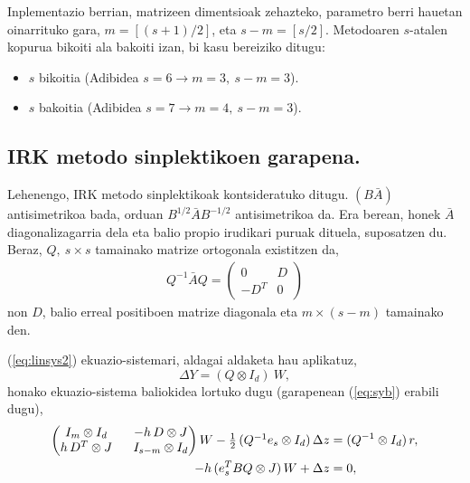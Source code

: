 Inplementazio berrian, matrizeen dimentsioak zehazteko, parametro berri hauetan oinarrituko gara,
$m=[(s+1)/2]$, eta $s-m =[s/2]$. Metodoaren $s$-atalen kopurua bikoiti ala bakoiti izan, bi kasu bereiziko ditugu:
\begin{itemize}
\item $s$ bikoitia (Adibidea $s=6 \rightarrow m=3,\ s-m=3$).
\item $s$ bakoitia (Adibidea $s=7 \rightarrow m=4,\ s-m=3$).
\end{itemize}

\subsection{IRK metodo sinplektikoen garapena.}
\label{ss:733}

Lehenengo, IRK metodo sinplektikoak kontsideratuko ditugu. $(B \bar{A})$ antisimetrikoa bada, orduan $B^{1/2}\bar{A}B^{-1/2}$ antisimetrikoa da. Era berean, honek $\bar{A}$ diagonalizagarria dela eta  balio propio irudikari puruak dituela, suposatzen du. Beraz,  $Q, \ s \times s$ tamainako matrize ortogonala existitzen da,
\begin{align}
\label{eq:syb}
Q^{-1}\bar{A}Q=
\left(
\begin{matrix}
0 & D \\
-D^T & 0
\end{matrix}
\right)
\end{align}
non $D$,  balio erreal positiboen matrize diagonala eta $m \times (s-m)$ tamainako den. 

(\ref{eq:linsys2}) ekuazio-sistemari, aldagai aldaketa hau aplikatuz,
\begin{equation*}
 \Delta Y = (Q \otimes I_d) \ W,
\end{equation*}
%
honako ekuazio-sistema baliokidea lortuko dugu (garapenean (\ref{eq:syb}) erabili dugu),
\begin{equation}
\label{eq:linsys3}
\begin{split}
  \left(
  \begin{matrix}
    I_m \otimes I_d \ & \  -h \, D \otimes J  \\
    h \, D^T \otimes J \ & \ I_{s-m} \otimes I_d 
  \end{matrix}
\right) W -  \textstyle \frac12\, (Q^{-1} e_s \otimes I_d) \, \Delta z &=  (Q^{-1} \otimes I_d )\, r, \\
- h \, (e_s^T  B Q \otimes J) \, W + \Delta z &= 0,
\end{split}
\end{equation}

